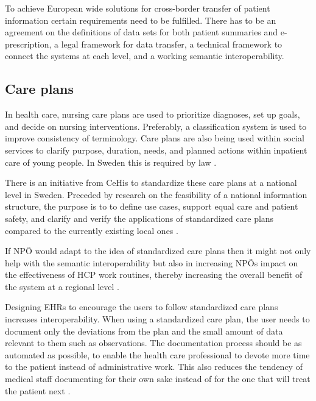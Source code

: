 \documentclass[14pt]{article}
\begin{document}
To achieve European wide solutions for cross-border transfer of patient information certain requirements need to be fulfilled. There has to be an agreement on the definitions of data sets for both patient summaries and e-prescription, a legal framework for data transfer, a technical framework to connect the systems at each level, and a working semantic \gls{interoperability}. \cite{epSOS1}
\label{sec:interopPrereq}

\subsection{Care plans}
\label{sec:interopPlans}
In health care, nursing care plans are used to prioritize diagnoses, set up goals, and decide on nursing interventions. Preferably, a classification system is used to improve consistency of terminology. Care plans are also being used within social services to clarify purpose, duration, needs, and planned actions within inpatient care of young people. In Sweden this is required by law \cite{SocialServices}.

There is an initiative from \gls{CeHis} to standardize these care plans at a national level in Sweden. Preceded by research on the feasibility of a national information structure, the purpose is to to define use cases, support equal care and patient safety, and clarify and verify the applications of standardized care plans compared to the currently existing local ones \cite{CeHis}.

If NPÖ would adapt to the idea of standardized care plans then it might not only help with the semantic interoperability but also in increasing NPÖs impact on the effectiveness of HCP work routines, thereby increasing the overall benefit of the system at a regional level \cite{Cambio}.

Designing \glspl{EHR} to encourage the users to follow standardized care plans increases interoperability. When using a standardized care plan, the user needs to document only the deviations from the plan and the small amount of data relevant to them such as observations. The documentation process should be as automated as possible, to enable the health care professional to devote more time to the patient instead of administrative work. This also reduces the tendency of medical staff documenting for their own sake instead of for the one that will treat the patient next \cite{Cambio}.
\end{document}
